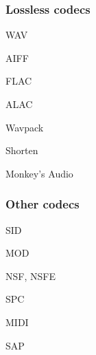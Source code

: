 \subsubsection{Lossless codecs}
\begin{changelog}
\item WAV
\item AIFF
\item FLAC
\item ALAC
\item Wavpack
\item Shorten
\item Monkey's Audio
\end{changelog}

\subsubsection{Other codecs}
\begin{changelog}
\item SID
\item MOD
\item NSF, NSFE
\item SPC
\item MIDI
\item SAP
\end{changelog}
